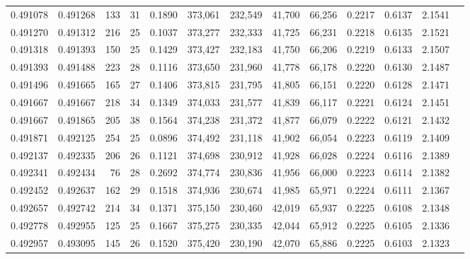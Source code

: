 \begin{tabular}{rrrrrrrrrrrrr}
0.491078 & 0.491268 &    133 &    31 &                                     0.1890 & 373,061 & 232,549 &  41,700 &  66,256 & 0.2217 & 0.6137 & 2.1541 \\
0.491270 & 0.491312 &    216 &    25 &                                     0.1037 & 373,277 & 232,333 &  41,725 &  66,231 & 0.2218 & 0.6135 & 2.1521 \\
0.491318 & 0.491393 &    150 &    25 &                                     0.1429 & 373,427 & 232,183 &  41,750 &  66,206 & 0.2219 & 0.6133 & 2.1507 \\
0.491393 & 0.491488 &    223 &    28 &                                     0.1116 & 373,650 & 231,960 &  41,778 &  66,178 & 0.2220 & 0.6130 & 2.1487 \\
0.491496 & 0.491665 &    165 &    27 &                                     0.1406 & 373,815 & 231,795 &  41,805 &  66,151 & 0.2220 & 0.6128 & 2.1471 \\
0.491667 & 0.491667 &    218 &    34 &                                     0.1349 & 374,033 & 231,577 &  41,839 &  66,117 & 0.2221 & 0.6124 & 2.1451 \\
0.491667 & 0.491865 &    205 &    38 &                                     0.1564 & 374,238 & 231,372 &  41,877 &  66,079 & 0.2222 & 0.6121 & 2.1432 \\
0.491871 & 0.492125 &    254 &    25 &                                     0.0896 & 374,492 & 231,118 &  41,902 &  66,054 & 0.2223 & 0.6119 & 2.1409 \\
0.492137 & 0.492335 &    206 &    26 &                                     0.1121 & 374,698 & 230,912 &  41,928 &  66,028 & 0.2224 & 0.6116 & 2.1389 \\
0.492341 & 0.492434 &     76 &    28 &                                     0.2692 & 374,774 & 230,836 &  41,956 &  66,000 & 0.2223 & 0.6114 & 2.1382 \\
0.492452 & 0.492637 &    162 &    29 &                                     0.1518 & 374,936 & 230,674 &  41,985 &  65,971 & 0.2224 & 0.6111 & 2.1367 \\
0.492657 & 0.492742 &    214 &    34 &                                     0.1371 & 375,150 & 230,460 &  42,019 &  65,937 & 0.2225 & 0.6108 & 2.1348 \\
0.492778 & 0.492955 &    125 &    25 &                                     0.1667 & 375,275 & 230,335 &  42,044 &  65,912 & 0.2225 & 0.6105 & 2.1336 \\
0.492957 & 0.493095 &    145 &    26 &                                     0.1520 & 375,420 & 230,190 &  42,070 &  65,886 & 0.2225 & 0.6103 & 2.1323 \\

\end{tabular}

